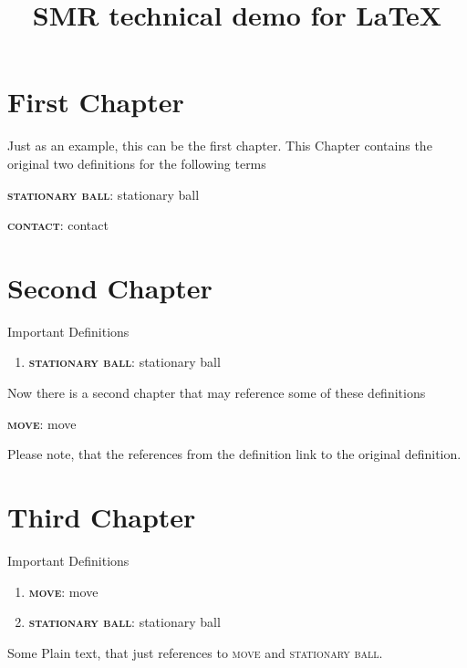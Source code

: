 \documentclass[fontsize=11pt, paper=a4]{report}
\newcommand{\refformat}[1]{{\textsc{#1}}}			 %
\newcommand{\defformat}[1]{{\textbf{\refformat{#1}}}}%
\newcommand{\tref}[1]{\refformat{{#1}}}
\newcommand{\tterm}[1]{
\defformat{#1}: \glsdesc{#1}
}
\begin{document}
\title{SMR technical demo for \LaTeX}
\maketitle

\pagestyle{plain}%
\chapter*{First Chapter}
Just as an example, this can be the first chapter. This Chapter contains the original two definitions for the following terms
\tterm{stationary ball}
\tterm{contact}

\newpage
\chapter*{Second Chapter}
Important Definitions
\begin{enumerate}
	\item{\tterm{stationary ball}}
\end{enumerate}

Now there is a second chapter that may reference some of these definitions
\tterm{move}
Please note, that the references from the definition link to the original definition.

\newpage
\chapter*{Third Chapter}
Important Definitions
\begin{enumerate}
	\item{\tterm{move}}
	\item{\tterm{stationary ball}}
\end{enumerate}
Some Plain text, that just references to \tref{move} and \tref{stationary ball}.

\clearpage

\printglossary%
\end{document}
